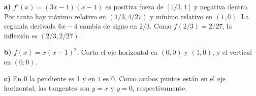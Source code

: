 \textbf{a)} $f'(x)=(3x-1)(x-1)$ es positiva fuera de
$[1/3,1]$ y negativa dentro. Por tanto hay máximo relativo
en $\boxed{(1/3,4/27)}$ y mínimo relativo en $\boxed{(1,0)}$.
La segunda derivada $6x-4$ cambia de signo en $2/3$.
Como $f(2/3)=2/27$, la inflexión es $\boxed{(2/3,2/27)}$.

\textbf{b)} $f(x)=x(x-1)^2$. Corta el eje horizontal
en $(0,0)$ y $(1,0)$, y el vertical en $(0,0)$.

\textbf{c)} En $0$ la pendiente es 1 y en $1$ es 0.
Como ambos puntos están en el eje horizontal,
las tangentes son $\boxed{y=x}$ y $\boxed{y=0}$, respectivamente.
